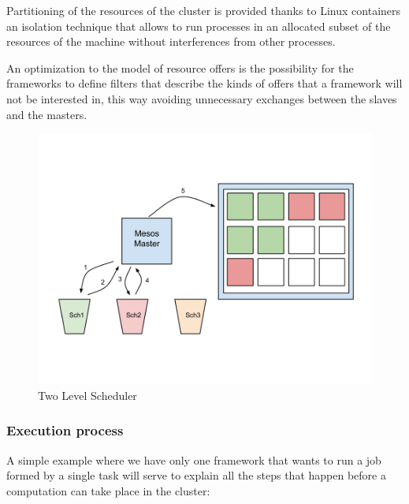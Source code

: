 \documentclass{svjour3}                     %
\begin{document}
Partitioning of the resources of the cluster is provided thanks to Linux containers \cite{_linux_????}
an isolation technique that allows to run processes in an allocated subset of the 
resources of the machine without interferences from other processes. 

An optimization to the model of resource offers is the possibility for the frameworks
to define filters that describe the kinds of offers that a framework will not be interested
in, this way avoiding unnecessary exchanges between the slaves and the masters.


\begin{figure}[!ht]
  \centering
  \includegraphics[scale=0.25,natwidth=960,natheight=720]{TwoLevel.png}
  \caption{Two Level Scheduler}
  \label{fig:two_level}
\end{figure}


\subsubsection{Execution process}

A simple example where we have only one framework that wants to run a 
job formed by a single task will serve to explain all the steps that happen
before a computation can take place in the cluster:
\end{document}
